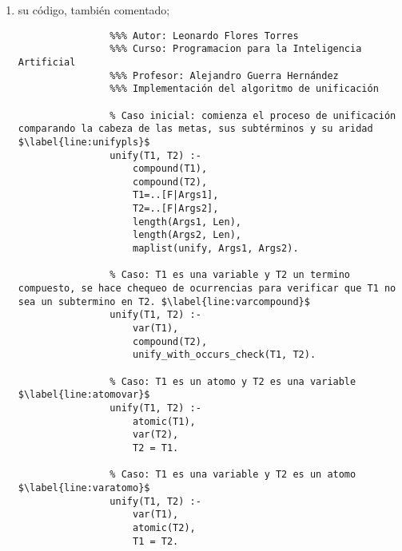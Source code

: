 \begin{enumerate}
\begin{enumerate}
        \item su código, también comentado;
        \begin{solution}
            \begin{verbatim}
                %%% Autor: Leonardo Flores Torres
                %%% Curso: Programacion para la Inteligencia Artificial
                %%% Profesor: Alejandro Guerra Hernández
                %%% Implementación del algoritmo de unificación

                % Caso inicial: comienza el proceso de unificación comparando la cabeza de las metas, sus subtérminos y su aridad $\label{line:unifypls}$
                unify(T1, T2) :-
                    compound(T1), 
                    compound(T2),
                    T1=..[F|Args1],
                    T2=..[F|Args2],
                    length(Args1, Len), 
                    length(Args2, Len),
                    maplist(unify, Args1, Args2).

                % Caso: T1 es una variable y T2 un termino compuesto, se hace chequeo de ocurrencias para verificar que T1 no sea un subtermino en T2. $\label{line:varcompound}$
                unify(T1, T2) :-
                    var(T1),
                    compound(T2),
                    unify_with_occurs_check(T1, T2).

                % Caso: T1 es un atomo y T2 es una variable $\label{line:atomovar}$
                unify(T1, T2) :-
                    atomic(T1),
                    var(T2),
                    T2 = T1.

                % Caso: T1 es una variable y T2 es un atomo $\label{line:varatomo}$
                unify(T1, T2) :-
                    var(T1),
                    atomic(T2),
                    T1 = T2.


\end{verbatim}
\end{solution}
\end{enumerate}
\end{enumerate}
